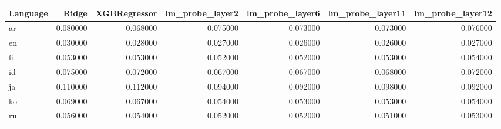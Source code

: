 \begin{tabular}{lrrrrrr}
\toprule
Language & Ridge & XGBRegressor & lm_probe_layer2 & lm_probe_layer6 & lm_probe_layer11 & lm_probe_layer12 \\
\midrule
ar & 0.080000 & 0.068000 & 0.075000 & 0.073000 & 0.073000 & 0.076000 \\
en & 0.030000 & 0.028000 & 0.027000 & 0.026000 & 0.026000 & 0.027000 \\
fi & 0.053000 & 0.053000 & 0.052000 & 0.052000 & 0.053000 & 0.054000 \\
id & 0.075000 & 0.072000 & 0.067000 & 0.067000 & 0.068000 & 0.072000 \\
ja & 0.110000 & 0.112000 & 0.094000 & 0.092000 & 0.098000 & 0.092000 \\
ko & 0.069000 & 0.067000 & 0.054000 & 0.053000 & 0.053000 & 0.054000 \\
ru & 0.056000 & 0.054000 & 0.052000 & 0.052000 & 0.051000 & 0.053000 \\
\bottomrule
\end{tabular}
